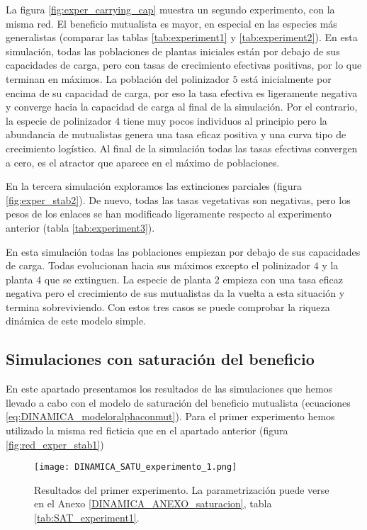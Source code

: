 La figura \ref{fig:exper_carrying_cap} muestra un segundo experimento, con la misma red. El beneficio mutualista es mayor, en especial en las especies más generalistas (comparar las tablas \ref{tab:experiment1} y \ref{tab:experiment2}). En esta simulación, todas las poblaciones de plantas iniciales están por debajo de sus capacidades de carga, pero con tasas de crecimiento efectivas positivas, por lo que terminan en máximos. La población del polinizador $5$ está inicialmente por encima de su capacidad de carga, por eso la tasa efectiva es ligeramente negativa y converge hacia la capacidad de carga al final de la simulación. Por el contrario, la especie de polinizador $4$ tiene muy pocos individuos al principio pero la abundancia de mutualistas genera una tasa eficaz positiva y una curva tipo de crecimiento logístico. Al final de la simulación todas las tasas efectivas convergen a cero, es el atractor que aparece en el máximo de poblaciones.

En la tercera simulación exploramos las extinciones parciales (figura \ref{fig:exper_stab2}). De nuevo, todas las tasas vegetativas son negativas, pero los pesos de los enlaces se han modificado ligeramente respecto al experimento anterior (tabla \ref{tab:experiment3}).

En esta simulación todas las poblaciones empiezan por debajo de sus capacidades de carga. Todas evolucionan hacia sus máximos excepto el polinizador $4$ y la planta $4$ que se extinguen. La especie de planta $2$ empieza con una tasa eficaz negativa pero el crecimiento de sus mutualistas da la vuelta a esta situación y termina sobreviviendo. Con estos tres casos se puede comprobar la riqueza dinámica de este modelo simple.

\clearpage
\subsection{Simulaciones con saturación del beneficio}
\label{results_alfa}

En este apartado presentamos los resultados de las simulaciones que hemos llevado a cabo con el modelo de saturación del beneficio mutualista (ecuaciones \ref{eq:DINAMICA_modeloralphaconmut}). Para el primer experimento hemos utilizado la misma red ficticia que en el apartado anterior (figura \ref{fig:red_exper_stab1})

\begin{figure}[b!]
\centering
\texttt{[image: DINAMICA\_SATU\_experimento\_1.png]}
\caption {Resultados del primer experimento. La parametrización puede verse en el Anexo \ref{DINAMICA_ANEXO_saturacion}, tabla \ref{tab:SAT_experiment1}.}
\label{fig:DINAMICA_SAT_exper_stab1}
\end{figure}

